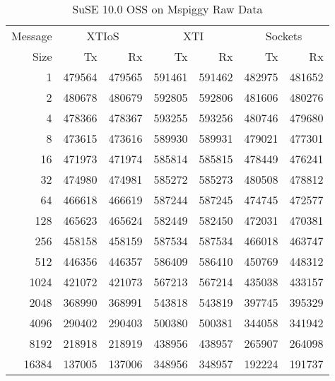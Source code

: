 \documentclass[letterpaper,final,notitlepage,twocolumn,10pt,twoside]{article}
\begin{document}
\begin{appendix}
\begin{table}[hbp]
\footnotesize
\begin{center}
\setlength{\tabcolsep}{0.3em}
\setlength{\arraycolsep}{0.3em}
\begin{tabular}{rrrrrrr}\\
Message & \multicolumn{2}{c}{XTIoS} & \multicolumn{2}{c}{XTI} & \multicolumn{2}{c}{Sockets}\\
Size & Tx & Rx & Tx & Rx & Tx & Rx\\
\hline
\hline
1 & 479564 & 479565 & 591461 & 591462 & 482975 & 481652\\
2 & 480678 & 480679 & 592805 & 592806 & 481606 & 480276\\
4 & 478366 & 478367 & 593255 & 593256 & 480746 & 479680\\
8 & 473615 & 473616 & 589930 & 589931 & 479021 & 477301\\
16 & 471973 & 471974 & 585814 & 585815 & 478449 & 476241\\
32 & 474980 & 474981 & 585272 & 585273 & 480508 & 478812\\
64 & 466618 & 466619 & 587244 & 587245 & 474745 & 472577\\
128 & 465623 & 465624 & 582449 & 582450 & 472031 & 470381\\
256 & 458158 & 458159 & 587534 & 587534 & 466018 & 463747\\
512 & 446356 & 446357 & 586409 & 586410 & 450769 & 448312\\
1024 & 421072 & 421073 & 567213 & 567214 & 435038 & 433157\\
2048 & 368990 & 368991 & 543818 & 543819 & 397745 & 395329\\
4096 & 290402 & 290403 & 500380 & 500381 & 344058 & 341942\\
8192 & 218918 & 218919 & 438956 & 438957 & 265907 & 264098\\
16384 & 137005 & 137006 & 348956 & 348957 & 192224 & 191737\\
\hline
\end{tabular}
\end{center}
\normalsize
\caption[SuSE 10.0 OSS on Mspiggy Raw Data]{SuSE 10.0 OSS on Mspiggy Raw Data}
\label{table:nbdata}
\end{table}

\end{appendix}
\end{document}
